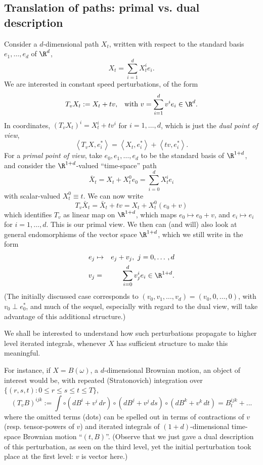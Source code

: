 \documentclass{article}
\begin{document}
\subsection{Translation of paths: primal vs. dual description} \label{sec:12}

Consider a $d$-dimensional path $X_{t}$, written with respect to the
standard basis $e_{1},\dots ,e_{d}$ of $\R^{d}$,%
\[
X_{t}=\sum_{i=1}^{d}X_{t}^{i}e_{i}.
\]%
We are interested in constant speed perturbations, of the form%
\[
T_{v}X_{t}:=X_{t}+tv,\,\,\,\text{\ with }v=\sum_{i=1}^{d}v^{i}e_{i}\in \R^{d}%
\text{.}
\]%
In coordinates, $\left( T_{v}X_{t}\right) ^{i}=X_{t}^{i}+tv^{i}$ for $%
i=1,\dots ,d$, which is just the \textit{dual point of view},%
\[
\left\langle T_{v}X,e_{i}^{\ast }\right\rangle =\left\langle
X_{t},e_{i}^{\ast }\right\rangle +\left\langle tv,e_{i}^{\ast }\right\rangle
.
\]%
For a \textit{primal point of view}, take $e_{0},e_{1},\dots ,e_{d}$ to be the
standard basis of $\R^{1+d}$, and consider the $\R^{1+d}$-valued ``time-space'' path 
$$\bar{X}%
_{t}=X_{t}+X_{t}^{0}e_{0}=\sum_{i=0}^{d}X_{t}^{i}e_{i}
$$ with scalar-valued $%
X_{t}^{0}\equiv t$. We can now write%
\[
T_{v}\bar{X}_{t}=\bar{X}_{t}+tv=X_{t}+X_{t}^{0}\left( e_{0}+v\right) 
\]%
which identifies $T_{v}$ as linear map on $\R^{1+d}$, which maps $%
e_{0}\mapsto e_{0}+v$, and $e_{i}\mapsto e_{i}$ for $i=1,\dots ,d$. This is
our primal view. We then can (and will) also look at general endomorphisms
of the vector space $\R^{1+d}$, which we still write in the form  
\begin{eqnarray*}
e_{j} &\mapsto &e_{j}+v_{j},\,\,j=0,\dots \,,d \\
v_{j} &=&\sum_{i=0}^{d}v_{j}^{i}e_{i}\in \R^{1+d}.
\end{eqnarray*}%
(The initially discussed case corresponds to $\left( v_{0},v_{1},\dots
,v_{d}\right) =\left( v_{0},0,\dots ,0\right) $, with $v_{0}\perp
e_{0}^{\ast }$, and much of the sequel, especially with regard to the dual
view, will take advantage of this additional structure.)

\bigskip

We shall be interested to understand how such perturbations propagate to higher level iterated integrals, whenever $X$ has sufficient structure to make this meaningful.

For instance, if $X=B(\omega)$, a $d$-dimensional Brownian motion, an object of interest would be, with repeated (Stratonovich) integration over $\{ (r,s,t): 0 \le r \le s \le t \le T \}$,
$$
    (T_v B)^{ijk} :=  \int \circ (dB^i + v^i\, dr ) \circ (dB^j + v^j\, ds)  \circ (dB^k + v^k\, dt) =  B_t^{ijk} + ... $$
where the omitted terms (dots) can be spelled out in terms of contractions of $v$ (resp. tensor-powers of $v$) and iterated integrals of $(1+d)$-dimensional time-space Brownian motion ``$(t,B)$''. (Observe that we just gave a dual description of this perturbation, as seen on the third level, yet the initial perturbation took place at the first level: $v$ is vector here.)
\end{document}
